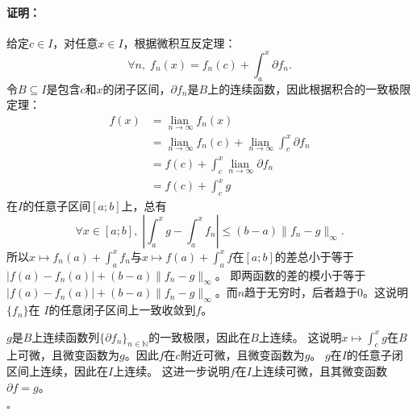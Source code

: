 \documentclass[12pt,UTF8]{ctexbook}
\newcommand{\lian}[1]{
    \underset{#1}{\operatorname{lian}\,}
}
\theoremstyle{definition}
\theoremstyle{plain}
\renewenvironment{proof}{\paragraph{\textbf{证明：}}}{\hfill$\square$}
\begin{document}
\begin{appendix}
\begin{proof}
    给定$c\in I$，对任意$x\in I$，根据微积互反定理：
    $$ \forall n,\; f_n(x) = f_n(c) + \int_a^x \partial f_n. $$
    令$B\subseteq I$是包含$c$和$x$的闭子区间，$\partial f_n$是$B$上的连续函数，因此根据积合的一致极限定理：
    \begin{align*}
        f(x) &= \lian{n\to\infty} f_n(x) \\
        &= \lian{n\to\infty} f_n(c) + \lian{n\to\infty} \int_c^x \partial f_n \\
        &= f(c) + \int_c^x \lian{n\to\infty} \partial f_n \\
        &= f(c) + \int_c^x g
    \end{align*}
    在$I$的任意子区间$[a;b]$上，总有
    $$ \forall x \in [a;b], \; \left|\int_a^x g - \int_a^x f_n \right| \leqslant (b - a) \|f_n - g\|_{\infty}.$$
    所以$x\mapsto f_n(a) + \int_a^x f_n$与$x\mapsto f(a) + \int_a^x f$在$[a;b]$的差总小于等于$|f(a) - f_n(a)| + (b - a) \|f_n - g\|_{\infty}$。
    即两函数的差的模小于等于$|f(a) - f_n(a)| + (b - a) \|f_n - g\|_{\infty}$。而$n$趋于无穷时，后者趋于$0$。这说明$\{f_n\}$在
    $I$的任意闭子区间上一致收敛到$f$。

    $g$是$B$上连续函数列$\{\partial f_n\}_{n\in\mathbb{N}}$的一致极限，因此在$B$上连续。
    这说明$x\mapsto \int_c^x g $在$B$上可微，且微变函数为$g$。因此$f$在$c$附近可微，且微变函数为$g$。
    $g$在$I$的任意子闭区间上连续，因此在$I$上连续。
    这进一步说明$f$在$I$上连续可微，且其微变函数$\partial f = g$。
    

\end{proof}
\end{appendix}
\end{document}
